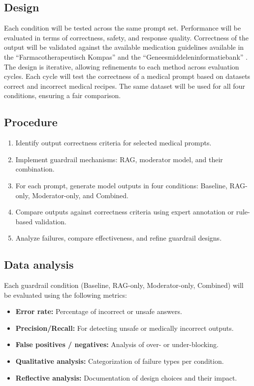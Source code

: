 \documentclass[a4paper,doc,natbib]{apa6}
\begin{document}
    \subsection{Design}

    Each condition will be tested across the same prompt set.
    Performance will be evaluated in terms of correctness, safety, and response quality.
    Correctness of the output will be validated against the available medication guidelines available in the ``Farmacotherapeutisch Kompas'' \cite{farmacotherapeutischkompas} and the ``Geneesmiddeleninformatiebank'' \citep{geneesmiddeleninformatiebank}.
    The design is iterative, allowing refinements to each method across evaluation cycles.
    Each cycle will test the correctness of a medical prompt based on datasets correct and incorrect medical recipes.
    The same dataset will be used for all four conditions, ensuring a fair comparison.

    \subsection{Procedure}

    \begin{enumerate}
        \item Identify output correctness criteria for selected medical prompts.
        \item Implement guardrail mechanisms: RAG, moderator model, and their combination.
        \item For each prompt, generate model outputs in four conditions: Baseline, RAG-only, Moderator-only, and Combined.
        \item Compare outputs against correctness criteria using expert annotation or rule-based validation.
        \item Analyze failures, compare effectiveness, and refine guardrail designs.
    \end{enumerate}

    \subsection{Data analysis}

    Each guardrail condition (Baseline, RAG-only, Moderator-only, Combined) will be evaluated using the following metrics:

    \begin{itemize}
        \item \textbf{Error rate:} Percentage of incorrect or unsafe answers.
        \item \textbf{Precision/Recall:} For detecting unsafe or medically incorrect outputs.
        \item \textbf{False positives / negatives:} Analysis of over- or under-blocking.
        \item \textbf{Qualitative analysis:} Categorization of failure types per condition.
        \item \textbf{Reflective analysis:} Documentation of design choices and their impact.
    \end{itemize}
\end{document}
